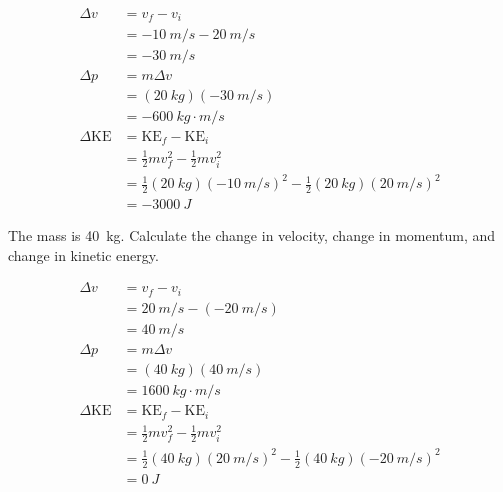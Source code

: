 \documentclass[../main-physics-problems.tex]{subfiles}
\begin{document}
\begin{questions}
\begin{solution}
\begin{align*}
    \Delta v &= v_f - v_i \\[1ex]
    &= \SI{-10}{m/s} - \SI{20}{m/s} \\[1ex]
    &= \boxed{\SI{-30}{m/s}} \\[2ex]
    \Delta p &= m \Delta v \\[1ex]
    &= (\SI{20}{kg})(\SI{-30}{m/s}) \\[1ex]
    &= \boxed{\SI{-600}{kg\cdot m/s}} \\[2ex]
    \Delta \mathrm{KE} &= \mathrm{KE}_f - \mathrm{KE}_i \\[1ex]
    &= \frac{1}{2}m v_f^2 - \frac{1}{2}mv_i^2 \\[1ex]
    &= \frac{1}{2}(\SI{20}{kg})(\SI{-10}{m/s})^2 - \frac{1}{2}(\SI{20}{kg}) (\SI{20}{m/s})^2 \\[1ex]
    &= \boxed{\SI{-3000}{J}}
\end{align*}
\end{solution}


\ifprintanswers
    \clearpage
\fi
\question
The mass is \SI{40}{kg}. Calculate the change in velocity, change in momentum, and change in kinetic energy. 

\begin{center}
\end{center}

\begin{solution}
\begin{align*}
    \Delta v &= v_f - v_i \\[1ex]
    &= \SI{20}{m/s} - (\SI{-20}{m/s}) \\[1ex]
    &= \boxed{\SI{40}{m/s}} \\[2ex]
    \Delta p &= m \Delta v \\[1ex]
    &= (\SI{40}{kg})(\SI{40}{m/s}) \\[1ex]
    &= \boxed{\SI{1600}{kg\cdot m/s}} \\[2ex]
    \Delta \mathrm{KE} &= \mathrm{KE}_f - \mathrm{KE}_i \\[1ex]
    &= \frac{1}{2}m v_f^2 - \frac{1}{2}mv_i^2 \\[1ex]
    &= \frac{1}{2}(\SI{40}{kg})(\SI{20}{m/s})^2 - \frac{1}{2}(\SI{40}{kg}) (\SI{-20}{m/s})^2 \\[1ex]
    &= \boxed{\SI{0}{J}}
\end{align*}
\end{solution}



\end{questions}
\end{document}
